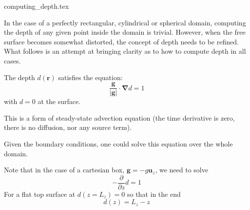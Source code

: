 
\begin{flushright} {\tiny {\color{gray} computing\_depth.tex}} \end{flushright}

In the case of a perfectly rectangular, cylindrical or spherical domain, 
computing the depth of any given point inside the domain is trivial. 
However, when the free surface becomes somewhat distorted, the concept of 
depth needs to be refined. What follows is an attempt at bringing clarity
as to how to compute depth in all cases.

The depth $d({\bm r})$ satisfies the equation:
\[
\frac{{\bm g}}{|{\bm g}|} \cdot {\bm \nabla} d = 1
\]
with $d=0$ at the surface.

This is a form of steady-state advection equation (the time derivative is zero, 
there is no diffusion, nor any source term).

Given the boundary conditions, one could solve this equation 
over the whole domain. 

Note that in the case of a cartesian box, ${\bm g}=-g {\bm u}_z$,
we need to solve 
\[
- \frac{\partial}{\partial z} d = 1
\]
For a flat top surface at $d(z=L_z)=0$ so that in the end
\[
d(z)=L_z-z
\]

